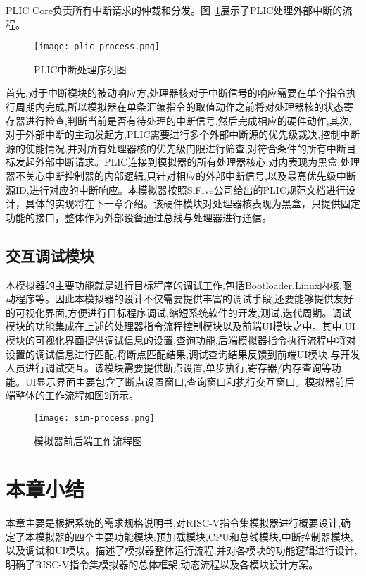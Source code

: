 PLIC Core负责所有中断请求的仲裁和分发。图~\ref{fig:plic-process}展示了PLIC处理外部中断的流程。
\begin{figure}[h]
    \centering
    \texttt{[image: plic-process.png]}
    \caption{PLIC中断处理序列图}
    \label{fig:plic-process}
\end{figure}

首先,对于中断模块的被动响应方,处理器核对于中断信号的响应需要在单个指令执行周期内完成,所以模拟器在单条汇编指令的取值动作之前将对处理器核的状态寄存器进行检查,判断当前是否有待处理的中断信号,然后完成相应的硬件动作;其次,对于外部中断的主动发起方,PLIC需要进行多个外部中断源的优先级裁决,控制中断源的使能情况,并对所有处理器核的优先级门限进行筛查,对符合条件的所有中断目标发起外部中断请求。PLIC连接到模拟器的所有处理器核心,对内表现为黑盒,处理器不关心中断控制器的内部逻辑,只针对相应的外部中断信号,以及最高优先级中断源ID,进行对应的中断响应。本模拟器按照SiFive公司给出的PLIC规范文档进行设计，具体的实现将在下一章介绍。该硬件模块对处理器核表现为黑盒，只提供固定功能的接口，整体作为外部设备通过总线与处理器进行通信。

\subsection{交互调试模块}
本模拟器的主要功能就是进行目标程序的调试工作,包括Bootloader,Linux内核,驱动程序等。因此本模拟器的设计不仅需要提供丰富的调试手段,还要能够提供友好的可视化界面,方便进行目标程序调试,缩短系统软件的开发,测试,迭代周期。调试模块的功能集成在上述的处理器指令流程控制模块以及前端UI模块之中。其中,UI模块的可视化界面提供调试信息的设置,查询功能,后端模拟器指令执行流程中将对设置的调试信息进行匹配,将断点匹配结果,调试查询结果反馈到前端UI模块,与开发人员进行调试交互。该模块需要提供断点设置,单步执行,寄存器/内存查询等功能。UI显示界面主要包含了断点设置窗口,查询窗口和执行交互窗口。模拟器前后端整体的工作流程如图\ref{fig:work-frame}所示。
\begin{figure}[H]
  \centering
  \texttt{[image: sim-process.png]}
  \caption{模拟器前后端工作流程图}
  \label{fig:work-frame}
\end{figure}

\section{本章小结}
本章主要是根据系统的需求规格说明书,对RISC-V指令集模拟器进行概要设计,确定了本模拟器的四个主要功能模块:预加载模块,CPU和总线模块,中断控制器模块,以及调试和UI模块。描述了模拟器整体运行流程,并对各模块的功能逻辑进行设计,明确了RISC-V指令集模拟器的总体框架,动态流程以及各模块设计方案。